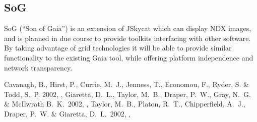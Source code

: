 \subsection{SoG}
\label{sec:sog}

SoG (``Son of Gaia'') is an extension of JSkycat which can display
NDX images, and is planned in due course to provide toolkits interfacing
with other software.
By taking advantage of grid technologies it will be able to provide
similar functionality to the existing Gaia tool, while offering
platform independence and network transparency.


\begin{references}
 Cavanagh, B., Hirst, P., Currie, M.\ J., Jenness, T., Economou, F.,
           Ryder, S. \& Todd, S.\ P. 2002, \adassxii, 
{} Giaretta, D.\ L., Taylor, M.\ B., Draper, P.\ W., Gray, N.\ G. \&
           McIlwrath B.\ K.\ 2002, \adassxii, 
 Taylor, M.\ B., Platon, R.\ T., Chipperfield, A.\ J.,
           Draper, P.\ W. \& Giaretta, D.\ L.\ 2002, \adassxii, 
\end{references}


